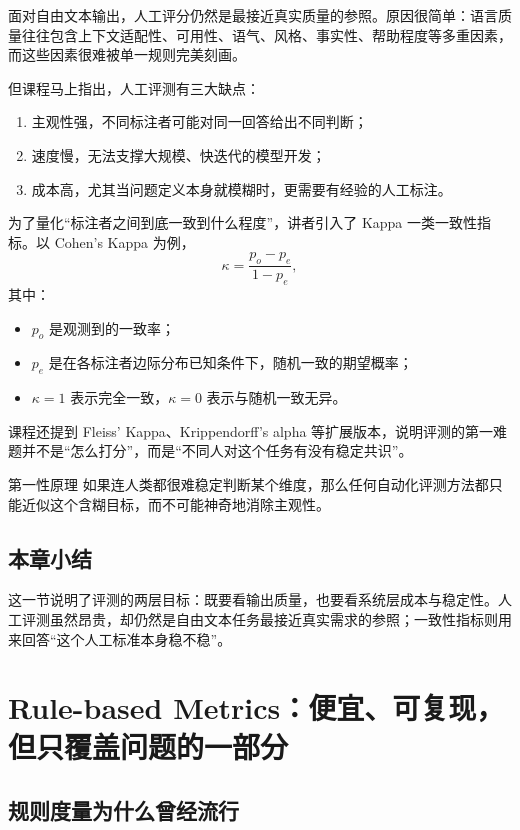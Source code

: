 \documentclass[a4paper]{article}
\begin{document}
面对自由文本输出，人工评分仍然是最接近真实质量的参照。原因很简单：语言质量往往包含上下文适配性、可用性、语气、风格、事实性、帮助程度等多重因素，而这些因素很难被单一规则完美刻画。

但课程马上指出，人工评测有三大缺点：

\begin{enumerate}
\item 主观性强，不同标注者可能对同一回答给出不同判断；
\item 速度慢，无法支撑大规模、快迭代的模型开发；
\item 成本高，尤其当问题定义本身就模糊时，更需要有经验的人工标注。
\end{enumerate}

为了量化“标注者之间到底一致到什么程度”，讲者引入了 Kappa 一类一致性指标。以 Cohen's Kappa 为例，
\[
\kappa = \frac{p_o - p_e}{1 - p_e},
\]
其中：
\begin{itemize}
\item $p_o$ 是观测到的一致率；
\item $p_e$ 是在各标注者边际分布已知条件下，随机一致的期望概率；
\item $\kappa = 1$ 表示完全一致，$\kappa = 0$ 表示与随机一致无异。
\end{itemize}

课程还提到 Fleiss' Kappa、Krippendorff's alpha 等扩展版本，说明评测的第一难题并不是“怎么打分”，而是“不同人对这个任务有没有稳定共识”。

\begin{importantbox}{第一性原理}
如果连人类都很难稳定判断某个维度，那么任何自动化评测方法都只能近似这个含糊目标，而不可能神奇地消除主观性。
\end{importantbox}

\subsection{本章小结}

这一节说明了评测的两层目标：既要看输出质量，也要看系统层成本与稳定性。人工评测虽然昂贵，却仍然是自由文本任务最接近真实需求的参照；一致性指标则用来回答“这个人工标准本身稳不稳”。

\section{Rule-based Metrics：便宜、可复现，但只覆盖问题的一部分}

\subsection{规则度量为什么曾经流行}
\end{document}
